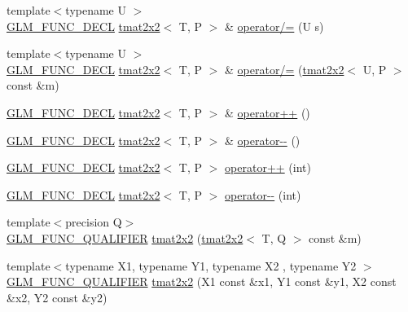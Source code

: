 \begin{DoxyCompactItemize}
{\footnotesize template$<$typename U $>$ }\\\hyperlink{setup_8hpp_ab2d052de21a70539923e9bcbf6e83a51}{G\+L\+M\+\_\+\+F\+U\+N\+C\+\_\+\+D\+E\+CL} \hyperlink{structglm_1_1detail_1_1tmat2x2}{tmat2x2}$<$ T, P $>$ \& \hyperlink{structglm_1_1detail_1_1tmat2x2_a646ced88a0720120d4664a65a5a5ae29}{operator/=} (U s)
\item 
{\footnotesize template$<$typename U $>$ }\\\hyperlink{setup_8hpp_ab2d052de21a70539923e9bcbf6e83a51}{G\+L\+M\+\_\+\+F\+U\+N\+C\+\_\+\+D\+E\+CL} \hyperlink{structglm_1_1detail_1_1tmat2x2}{tmat2x2}$<$ T, P $>$ \& \hyperlink{structglm_1_1detail_1_1tmat2x2_adc3e315d4094456e7b9865b05bb13625}{operator/=} (\hyperlink{structglm_1_1detail_1_1tmat2x2}{tmat2x2}$<$ U, P $>$ const \&m)
\item 
\hyperlink{setup_8hpp_ab2d052de21a70539923e9bcbf6e83a51}{G\+L\+M\+\_\+\+F\+U\+N\+C\+\_\+\+D\+E\+CL} \hyperlink{structglm_1_1detail_1_1tmat2x2}{tmat2x2}$<$ T, P $>$ \& \hyperlink{structglm_1_1detail_1_1tmat2x2_ab22b8afc9da04be4ff28de825ccf0176}{operator++} ()
\item 
\hyperlink{setup_8hpp_ab2d052de21a70539923e9bcbf6e83a51}{G\+L\+M\+\_\+\+F\+U\+N\+C\+\_\+\+D\+E\+CL} \hyperlink{structglm_1_1detail_1_1tmat2x2}{tmat2x2}$<$ T, P $>$ \& \hyperlink{structglm_1_1detail_1_1tmat2x2_a06b4e73ada53476205e52ce060506c90}{operator-\/-\/} ()
\item 
\hyperlink{setup_8hpp_ab2d052de21a70539923e9bcbf6e83a51}{G\+L\+M\+\_\+\+F\+U\+N\+C\+\_\+\+D\+E\+CL} \hyperlink{structglm_1_1detail_1_1tmat2x2}{tmat2x2}$<$ T, P $>$ \hyperlink{structglm_1_1detail_1_1tmat2x2_ab0857ca1fc8ebaf4f2999d64837efb08}{operator++} (int)
\item 
\hyperlink{setup_8hpp_ab2d052de21a70539923e9bcbf6e83a51}{G\+L\+M\+\_\+\+F\+U\+N\+C\+\_\+\+D\+E\+CL} \hyperlink{structglm_1_1detail_1_1tmat2x2}{tmat2x2}$<$ T, P $>$ \hyperlink{structglm_1_1detail_1_1tmat2x2_a72d5fa6f7e0f9745d8615781a0f18d58}{operator-\/-\/} (int)
\item 
{\footnotesize template$<$precision Q$>$ }\\\hyperlink{setup_8hpp_a33fdea6f91c5f834105f7415e2a64407}{G\+L\+M\+\_\+\+F\+U\+N\+C\+\_\+\+Q\+U\+A\+L\+I\+F\+I\+ER} \hyperlink{structglm_1_1detail_1_1tmat2x2_ae0e7fef5869427ad788ea783dc2c87cc}{tmat2x2} (\hyperlink{structglm_1_1detail_1_1tmat2x2}{tmat2x2}$<$ T, Q $>$ const \&m)
\item 
{\footnotesize template$<$typename X1, typename Y1, typename X2 , typename Y2 $>$ }\\\hyperlink{setup_8hpp_a33fdea6f91c5f834105f7415e2a64407}{G\+L\+M\+\_\+\+F\+U\+N\+C\+\_\+\+Q\+U\+A\+L\+I\+F\+I\+ER} \hyperlink{structglm_1_1detail_1_1tmat2x2_a9f87e4050f867fd35e7440996f569ab9}{tmat2x2} (X1 const \&x1, Y1 const \&y1, X2 const \&x2, Y2 const \&y2)

\end{DoxyCompactItemize}
